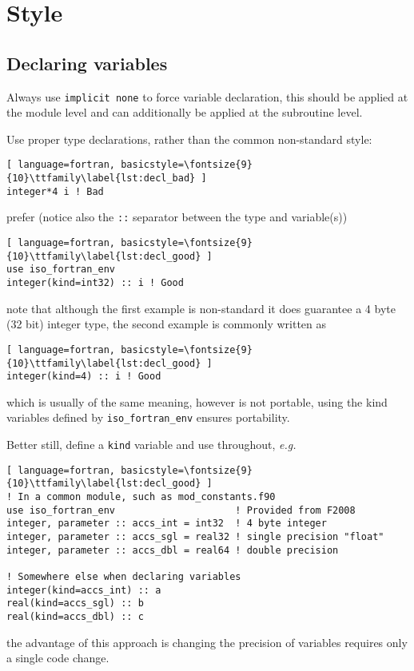 \documentclass[11pt]{article}
\begin{document}
\section{Style}

\subsection{Declaring variables}
Always use \texttt{implicit none} to force variable declaration, this should be applied at the
module level and can additionally be applied at the subroutine level.

Use proper type declarations, rather than the common non-standard style:
\begin{lstlisting}[ language=fortran, basicstyle=\fontsize{9}{10}\ttfamily\label{lst:decl_bad} ]
integer*4 i ! Bad
\end{lstlisting}
prefer (notice also the \texttt{::} separator between the type and variable(s))
\begin{lstlisting}[ language=fortran, basicstyle=\fontsize{9}{10}\ttfamily\label{lst:decl_good} ]
use iso_fortran_env
integer(kind=int32) :: i ! Good
\end{lstlisting}
note that although the first example is non-standard it does guarantee a 4 byte (32 bit) integer
type, the second example is commonly written as
\begin{lstlisting}[ language=fortran, basicstyle=\fontsize{9}{10}\ttfamily\label{lst:decl_good} ]
integer(kind=4) :: i ! Good
\end{lstlisting}
which is usually of the same meaning, however is not portable, using the kind variables defined by
\texttt{iso_fortran_env} ensures portability.

Better still, define a \texttt{kind} variable and use throughout, \textit{e.g.}
\begin{lstlisting}[ language=fortran, basicstyle=\fontsize{9}{10}\ttfamily\label{lst:decl_good} ]
! In a common module, such as mod_constants.f90
use iso_fortran_env                     ! Provided from F2008
integer, parameter :: accs_int = int32  ! 4 byte integer
integer, parameter :: accs_sgl = real32 ! single precision "float"
integer, parameter :: accs_dbl = real64 ! double precision

! Somewhere else when declaring variables
integer(kind=accs_int) :: a
real(kind=accs_sgl) :: b
real(kind=accs_dbl) :: c
\end{lstlisting}
the advantage of this approach is changing the precision of variables requires only a single code
change.
\end{document}
